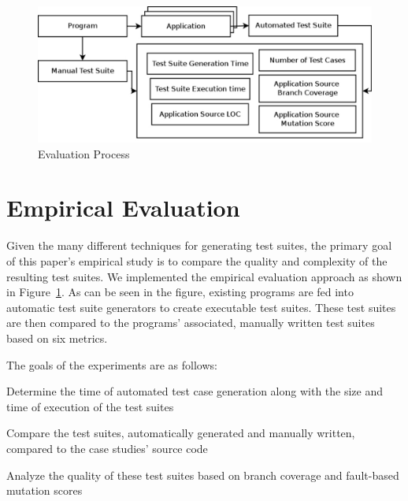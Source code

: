 
\begin{figure}[!t]
\centering
\captionsetup{justification=centering}
  \includegraphics[width=\linewidth]{proccess_diagram.pdf}
    \caption{Evaluation Process}
  \label{fig:process_diagram}
\end{figure}

\section{Empirical Evaluation}
\label{sec:evaluation}
Given the many different techniques for generating test suites, the primary goal of this paper's empirical study is to compare the quality and complexity of the resulting test suites.  We implemented the empirical evaluation approach as shown in Figure~\ref{fig:process_diagram}.  As can be seen in the figure, existing programs are fed into automatic test suite generators to create executable test suites.  These test suites are then compared to the programs' associated, manually written test suites based on six metrics.   

The goals of the experiments are as follows:
\squishlist
\item Determine the time of automated test case generation along with the size and time of execution of the test suites
\item Compare the test suites, automatically generated and manually written, compared to the case studies' source code
\item Analyze the quality of these test suites based on branch coverage and fault-based mutation scores
\squishend

